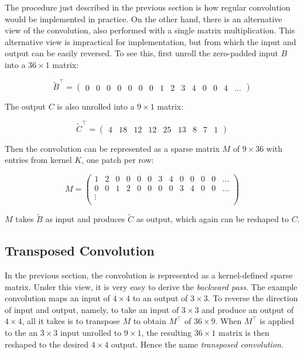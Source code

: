 The procedure just described in the previous section is how regular convolution would be implemented in
practice. On the other hand, there is an alternative view of the convolution, also performed with a single
matrix multiplication. This alternative view is impractical for implementation, but from which
the input and output can be easily reversed. To see this, first unroll the zero-padded input $B$ into
a $36 \times 1$ matrix:

\setcounter{MaxMatrixCols}{20}

$$
\tilde{B}^\intercal =
  \begin{pmatrix}
    0 & 0 & 0 & 0 & 0 & 0 & 0 & 1 & 2 & 3 & 4 & 0 & 0 & 4 & \dots
  \end{pmatrix}
$$

The output $C$ is also unrolled into a $9 \times 1$ matrix:

$$
\tilde{C}^\intercal =
  \begin{pmatrix}
    4 & 18 & 12 & 12 & 25 & 13 & 8 & 7 & 1
  \end{pmatrix}
$$

Then the convolution can be represented as a sparse matrix $M$ of $9 \times 36$ with entries from kernel $K$,
one patch per row:

$$
M =
  \begin{pmatrix}
    1 & 2 & 0 & 0 & 0 & 0 & 3 & 4 & 0 & 0 & 0 & 0 & \dots \\
    0 & 0 & 1 & 2 & 0 & 0 & 0 & 0 & 3 & 4 & 0 & 0 & \dots \\
    \vdots \\
  \end{pmatrix}
$$

$M$ takes $\tilde{B}$ as input and produces $\tilde{C}$ as output, which again can be reshaped to $C$.

\subsection{Transposed Convolution}

In the previous section, the convolution is represented as a kernel-defined sparse matrix. Under this view,
it is very easy to derive the \textit{backward pass}. The example convolution maps an input of $4 \times 4$
to an output of $3 \times 3$. To reverse the direction of input and output, namely, to take an input of
$3 \times 3$ and produce an output of $4 \times 4$, all it takes is to transpose $M$ to obtain $M^\intercal$
of $36 \times 9$. When $M^\intercal$ is applied to the an $3 \times 3$ input unrolled to $9 \times 1$, the
resulting $36 \times 1$ matrix is then reshaped to the desired $4 \times 4$ output. Hence the name
\textit{transposed convolution}.

